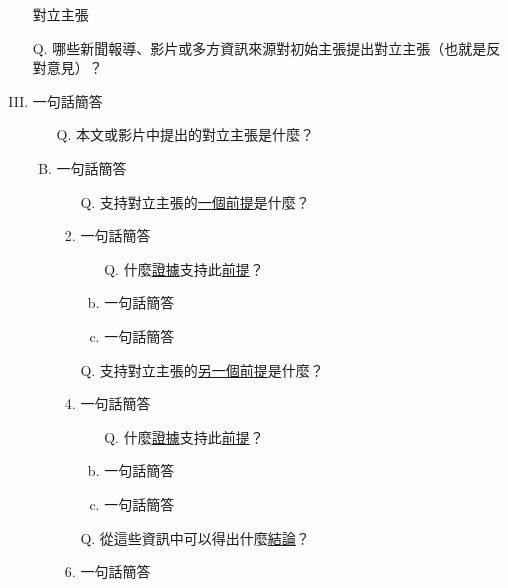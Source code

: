 \documentclass[a4paper, 12pt]{article}
\begin{document}
\begin{enumerate}[I.]
\begin{enumerate}[A.]
          \end{enumerate}
    \item [] {\color{red}對立主張}
    \item[Q.] 哪些新聞報導、影片或多方資訊來源對初始主張提出對立主張（也就是反對意見）？
    \item {\color{gray}一句話簡答} %
          \begin{enumerate}[A.]
              \item [Q.]本文或影片中提出的{\color{red}對立主張}是什麼？
              \item {\color{gray}一句話簡答} %
                    \begin{enumerate}[1.]
                        \item[Q.] 支持{\color{red}對立主張}的{\underline{一個前提}}是什麼？
                        \item{\color{gray}一句話簡答} %
                              \begin{enumerate}[a.]
                                  \item [Q.] 什麼{\underline{證據}}支持此{\underline{前提}}？
                                  \item {\color{gray}一句話簡答} %
                                  \item {\color{gray}一句話簡答} %
                              \end{enumerate}
                        \item [Q.]支持{\color{red}對立主張}的{\underline{另一個前提}}是什麼？
                        \item{\color{gray}一句話簡答} %
                              \begin{enumerate}[a.]
                                  \item [Q.] 什麼{\underline{證據}}支持此{\underline{前提}}？
                                  \item {\color{gray}一句話簡答} %
                                  \item {\color{gray}一句話簡答} %
                              \end{enumerate}
                        \item [Q.]從這些資訊中可以得出什麼{\underline{結論}}？
                        \item {\color{gray}一句話簡答} %
                    \end{enumerate}
          \end{enumerate}


\end{enumerate}
\end{document}
